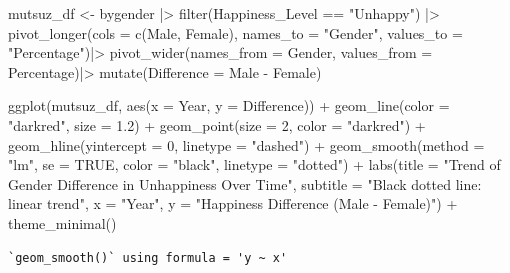 \documentclass[
  11pt,
  a4paper,
  DIV=11,
  numbers=noendperiod]{scrartcl}
\newenvironment{Shaded}{\begin{snugshade}}{\end{snugshade}}
\newcommand{\AttributeTok}[1]{\textcolor[rgb]{0.40,0.45,0.13}{#1}}
\newcommand{\ConstantTok}[1]{\textcolor[rgb]{0.56,0.35,0.01}{#1}}
\newcommand{\DecValTok}[1]{\textcolor[rgb]{0.68,0.00,0.00}{#1}}
\newcommand{\FloatTok}[1]{\textcolor[rgb]{0.68,0.00,0.00}{#1}}
\newcommand{\FunctionTok}[1]{\textcolor[rgb]{0.28,0.35,0.67}{#1}}
\newcommand{\NormalTok}[1]{\textcolor[rgb]{0.00,0.23,0.31}{#1}}
\newcommand{\OtherTok}[1]{\textcolor[rgb]{0.00,0.23,0.31}{#1}}
\newcommand{\SpecialCharTok}[1]{\textcolor[rgb]{0.37,0.37,0.37}{#1}}
\newcommand{\StringTok}[1]{\textcolor[rgb]{0.13,0.47,0.30}{#1}}
\begin{document}
\begin{Shaded}
\begin{Highlighting}[]
\NormalTok{mutsuz\_df }\OtherTok{\textless{}{-}}\NormalTok{ bygender }\SpecialCharTok{|\textgreater{}} 
  \FunctionTok{filter}\NormalTok{(Happiness\_Level }\SpecialCharTok{==} \StringTok{"Unhappy"}\NormalTok{) }\SpecialCharTok{|\textgreater{}} 
  \FunctionTok{pivot\_longer}\NormalTok{(}\AttributeTok{cols =} \FunctionTok{c}\NormalTok{(Male, Female), }
               \AttributeTok{names\_to =} \StringTok{"Gender"}\NormalTok{, }
               \AttributeTok{values\_to =} \StringTok{"Percentage"}\NormalTok{)}\SpecialCharTok{|\textgreater{}}  
  \FunctionTok{pivot\_wider}\NormalTok{(}\AttributeTok{names\_from =}\NormalTok{ Gender, }\AttributeTok{values\_from =}\NormalTok{ Percentage)}\SpecialCharTok{|\textgreater{}}
  \FunctionTok{mutate}\NormalTok{(}\AttributeTok{Difference =}\NormalTok{ Male }\SpecialCharTok{{-}}\NormalTok{ Female)  }
  
  \FunctionTok{ggplot}\NormalTok{(mutsuz\_df, }\FunctionTok{aes}\NormalTok{(}\AttributeTok{x =}\NormalTok{ Year, }\AttributeTok{y =}\NormalTok{ Difference)) }\SpecialCharTok{+}
  \FunctionTok{geom\_line}\NormalTok{(}\AttributeTok{color =} \StringTok{"darkred"}\NormalTok{, }\AttributeTok{size =} \FloatTok{1.2}\NormalTok{) }\SpecialCharTok{+}
  \FunctionTok{geom\_point}\NormalTok{(}\AttributeTok{size =} \DecValTok{2}\NormalTok{, }\AttributeTok{color =} \StringTok{"darkred"}\NormalTok{) }\SpecialCharTok{+}
  \FunctionTok{geom\_hline}\NormalTok{(}\AttributeTok{yintercept =} \DecValTok{0}\NormalTok{, }\AttributeTok{linetype =} \StringTok{"dashed"}\NormalTok{) }\SpecialCharTok{+}
  \FunctionTok{geom\_smooth}\NormalTok{(}\AttributeTok{method =} \StringTok{"lm"}\NormalTok{, }\AttributeTok{se =} \ConstantTok{TRUE}\NormalTok{, }\AttributeTok{color =} \StringTok{"black"}\NormalTok{, }\AttributeTok{linetype =} \StringTok{"dotted"}\NormalTok{) }\SpecialCharTok{+}
  \FunctionTok{labs}\NormalTok{(}\AttributeTok{title =} \StringTok{"Trend of Gender Difference in Unhappiness Over Time"}\NormalTok{,}
       \AttributeTok{subtitle =} \StringTok{"Black dotted line: linear trend"}\NormalTok{,}
       \AttributeTok{x =} \StringTok{"Year"}\NormalTok{, }\AttributeTok{y =} \StringTok{"Happiness Difference (Male {-} Female)"}\NormalTok{) }\SpecialCharTok{+}
  \FunctionTok{theme\_minimal}\NormalTok{()}
\end{Highlighting}
\end{Shaded}

\begin{verbatim}
`geom_smooth()` using formula = 'y ~ x'
\end{verbatim}
\end{document}
